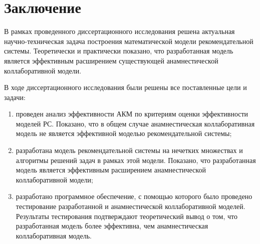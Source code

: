 \chapter*{Заключение}						%

В рамках проведенного диссертационного исследования решена актуальная
научно-техническая задача построения математической модели рекомендательной
системы. Теоретически и практически показано, что разработанная модель
является эффективным расширением существующей
анамнестической коллаборативной модели.

В ходе диссертационного исследования были решены все поставленные
цели и задачи:

\begin{enumerate}
	\item
		проведен анализ эффективности АКМ по критериям оценки
		эффективности моделей РС. Показано, что в общем случае
		анамнестическая коллаборативная модель не является
		эффективной моделью рекомендательной системы;
	\item разработана модель рекомендательной системы на нечетких
		множествах и алгоритмы решений задач в рамках этой модели.
		Показано, что разработанная модель является эффективным расширением
		анамнестической коллаборативной модели;
	\item разработано программное обеспечение, с помощью которого
		было проведено тестирование разработанной и анамнестической
		коллаборативной моделей. Результаты тестирования подтверждают
		теоретический вывод о том, что разработанная модель более эффективна,
		чем анамнестическая коллаборативная модель.
\end{enumerate}
